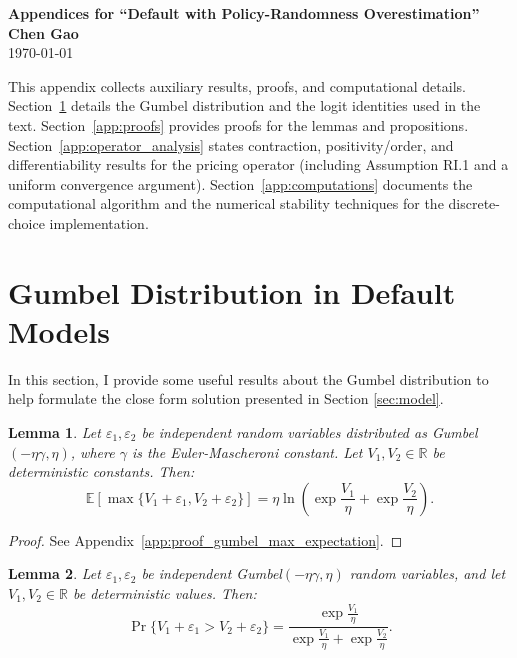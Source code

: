\documentclass[12pt]{article}
\theoremstyle{plain}
\newtheorem{lemma}{Lemma}
\begin{document}
\clearpage
\appendix

\setcounter{equation}{0}
\renewcommand{\theequation}{\thesection.\arabic{equation}}

\begin{center}
	\Large \textbf{Appendices for ``Default with Policy-Randomness Overestimation''}\\
	\vspace{0.5cm}
	\large \textbf{Chen Gao}
	\\
	\large \today
\end{center}

This appendix collects auxiliary results, proofs, and computational details.
Section~\ref{app:gumbel} details the Gumbel distribution and the logit
identities used in the text. Section~\ref{app:proofs} provides proofs for the
lemmas and propositions. Section~\ref{app:operator_analysis} states
contraction, positivity/order, and differentiability results for the pricing
operator (including Assumption RI.1 and a uniform convergence argument).
Section~\ref{app:computations} documents the computational algorithm and the
numerical stability techniques for the discrete-choice implementation.

\section{Gumbel Distribution in Default Models}\label{app:gumbel}
In this section, I provide some useful results about the Gumbel distribution to
help formulate the close form solution presented in Section \ref{sec:model}.

\begin{lemma}
	\label{lem:gumbel_max_expectation}
	Let $\varepsilon_1, \varepsilon_2$ be independent random variables distributed as Gumbel$(-\eta\gamma, \eta)$, where $\gamma$ is the Euler-Mascheroni constant. Let $V_1, V_2 \in \mathbb{R}$ be deterministic constants. Then:
	\begin{equation}
		\mathbb{E}\left[\max\{V_1 + \varepsilon_1, V_2 + \varepsilon_2\}\right] = \eta \ln\left( \exp\frac{V_1}{\eta} + \exp\frac{V_2}{\eta} \right).
	\end{equation}
\end{lemma}

\begin{proof}
	See Appendix~\ref{app:proof_gumbel_max_expectation}.
\end{proof}

\begin{lemma}
	\label{lem:gumbel_logit}
	Let $\varepsilon_1, \varepsilon_2$ be independent Gumbel$(-\eta\gamma, \eta)$ random variables, and let $V_1, V_2 \in \mathbb{R}$ be deterministic values. Then:
	\begin{equation}
		\Pr\{V_1 + \varepsilon_1 > V_2 + \varepsilon_2\} = \frac{\exp\frac{V_1}{\eta}}{\exp\frac{V_1}{\eta} + \exp\frac{V_2}{\eta}}.
	\end{equation}
\end{lemma}
\end{document}
